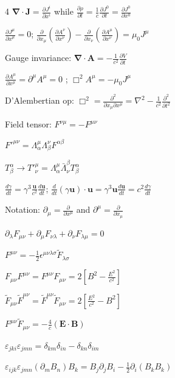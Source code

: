 \documentclass[a4paper,twoside]{article}
\begin{document}
\begin{multicols*}{4}
\( \bm \nabla \cdot \bm J = \frac{\partial J^{i}}{\partial x^i} \) while \(\frac{\partial \rho}{\partial t} = \frac{1}{c} \frac{\partial J^0}{\partial t } = \frac{\partial J^0}{\partial x^0}\)

\(\frac{\partial J^\mu}{\partial x^\mu} = 0\);
\(\frac{\partial}{\partial x_\mu }(\frac{\partial A^\nu}{\partial x^\nu})-\frac{\partial}{\partial x_\nu }(\frac{\partial A^\mu}{\partial x^\nu}) = \mu_0 J^\mu\)

Gauge invariance:
\(\bm \nabla \cdot \bm A = -\frac{1}{c^2} \frac{\partial V}{\partial t}\)

\(\frac{\partial A^\mu}{\partial x^\mu} = \partial^\mu A^\mu = 0\) ; \(\Box^2 A^\mu = - \mu_0 J^\mu\)

D'Alembertian op:
\(\Box^2 = \frac{\partial^2}{\partial x_\mu \partial x^\mu} = \nabla^2 -\frac{1}{c^2} \frac{\partial^2}{\partial t^2} \)    

Field tensor:
\(F^{\nu\mu} = - F^{\mu\nu}\)

\(F'^{\mu\nu} = \Lambda^\mu_\alpha \Lambda^\nu_\beta F^{\alpha\beta}\)

\(T^\alpha_\beta \to T'^\mu_\nu = \Lambda^\mu_\alpha \bar{\Lambda}_\nu^\beta T^{\alpha}_{\beta}\)

\(\frac{d \gamma}{d t} =\gamma^3 \frac{\bm u}{c^2} \frac{d \bm u}{dt}\);
\(
\frac{d}{dt} (\gamma \bm u) \cdot \bm u = \gamma^3 \bm u \frac{d \bm u}{dt} = c^2 \frac{d\gamma}{dt} \)

Notation: \(\partial_\mu = \frac{\partial}{\partial x^\mu}\) and \(\partial^\mu = \frac{\partial}{\partial x_\mu}\)


\(\partial_\lambda F_{\mu\nu} + \partial_\mu F_{\nu\lambda} + \partial_\nu F_{\lambda\mu} = 0 \)

\(F^{\mu\nu} = - \frac{1}{2} \epsilon^{\mu\nu\lambda\sigma} \tilde{F}_{\lambda\sigma} \)     

\(F_{\mu \nu} F^{\mu \nu} = F^{\mu \nu} F_{\mu \nu}  = 2[ B^2 - \frac{E^2}{c^2} ]\)

\(\tilde{F}_{\mu \nu} \tilde{F}^{\mu \nu} = \tilde{F}^{\mu \nu} \tilde{F}_{\mu \nu}  = 2[ \frac{E^2}{c^2} - B^2]\)

\(F^{\mu \nu } \tilde{F}_{\mu \nu} = -\frac{4}{c}(\bm E \cdot \bm B)\)

\(\varepsilon_{jki}\varepsilon_{jmn} = \delta_{km}\delta_{in} - \delta_{kn}\delta_{im}\)

\(\varepsilon_{ijk}\varepsilon_{jmn}(\partial_m B_n)B_k = B_j\partial_j B_i - \tfrac{1}{2}\partial_i(B_k B_k)\)


\end{multicols*}
\end{document}
